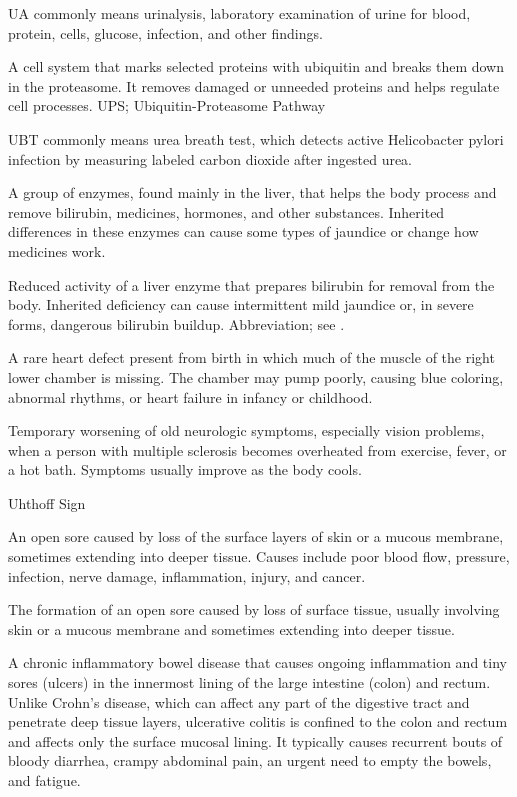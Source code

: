  UA commonly means urinalysis, laboratory examination of urine for blood, protein, cells, glucose, infection, and other findings.

 A cell system that marks selected proteins with ubiquitin and breaks them down in the proteasome. It removes damaged or unneeded proteins and helps regulate cell processes.
\synonyms
UPS; Ubiquitin-Proteasome Pathway

 UBT commonly means urea breath test, which detects active Helicobacter pylori infection by measuring labeled carbon dioxide after ingested urea.

 A group of enzymes, found mainly in the liver, that helps the body process and remove bilirubin, medicines, hormones, and other substances. Inherited differences in these enzymes can cause some types of jaundice or change how medicines work.

 Reduced activity of a liver enzyme that prepares bilirubin for removal from the body. Inherited deficiency can cause intermittent mild jaundice or, in severe forms, dangerous bilirubin buildup.
 Abbreviation; see .

 A rare heart defect present from birth in which much of the muscle of the right lower chamber is missing. The chamber may pump poorly, causing blue coloring, abnormal rhythms, or heart failure in infancy or childhood.

 Temporary worsening of old neurologic symptoms, especially vision problems, when a person with multiple sclerosis becomes overheated from exercise, fever, or a hot bath. Symptoms usually improve as the body cools.

\synonyms
Uhthoff Sign

 An open sore caused by loss of the surface layers of skin or a mucous membrane, sometimes extending into deeper tissue. Causes include poor blood flow, pressure, infection, nerve damage, inflammation, injury, and cancer.

 The formation of an open sore caused by loss of surface tissue, usually involving skin or a mucous membrane and sometimes extending into deeper tissue.

 A chronic inflammatory bowel disease that causes ongoing inflammation and tiny sores (ulcers) in the innermost lining of the large intestine (colon) and rectum. Unlike Crohn's disease, which can affect any part of the digestive tract and penetrate deep tissue layers, ulcerative colitis is confined to the colon and rectum and affects only the surface mucosal lining. It typically causes recurrent bouts of bloody diarrhea, crampy abdominal pain, an urgent need to empty the bowels, and fatigue.

